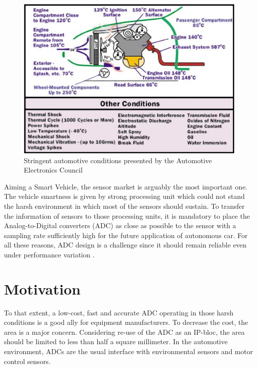 \begin{figure}[htp]
	\centering
	\includegraphics[width=.8\textwidth]{Chapter1/Figs/automotive_cond.png}
	\caption{Stringent automotive conditions presented by the Automotive Electronics Council~\cite{1393072,ISO16750}}
	\label{fig:automotive-cond}
\end{figure}

Aiming a Smart Vehicle, the sensor market is arguably the most important one. The vehicle smartness is given by strong processing unit which could not stand the harsh environment in which most of the sensors should sustain. To transfer the information of sensors to those processing units, it is mandatory to place the Analog-to-Digital converters (ADC) as close as possible to the sensor with a sampling rate sufficiently high for the future application of autonomous car. For all these reasons, ADC design is a challenge since it should remain reliable even under performance variation \cite{Cai2012}.

\section{Motivation}   %
To that extent, a low-cost, fast and accurate ADC operating in those harsh conditions is a good ally for equipment manufacturers. To decrease the cost, the area is a major concern. Considering re-use of the ADC as an IP-bloc, the area should be limited to less than half a square millimeter.
In the automotive environment, ADCs are the usual interface with environmental sensors and motor control sensors. 

